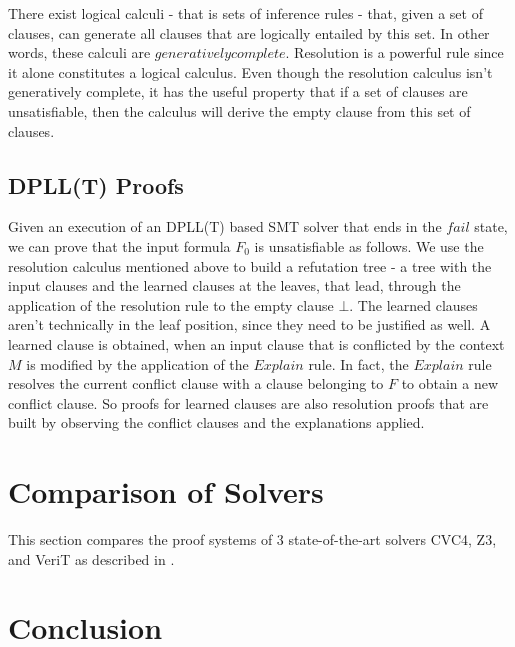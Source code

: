 \documentclass{report}
\begin{document}
There exist logical calculi - that is sets of inference 
rules - that, given a set of clauses, can generate all 
clauses that are logically entailed by this set. In other 
words, these calculi are $generatively complete$. Resolution 
is a powerful rule since it alone constitutes a logical 
calculus. Even though the resolution calculus 
isn't generatively complete, it has the useful property that 
if a set of clauses are unsatisfiable, then the calculus will 
derive the empty clause from this set of clauses. 


\subsection{DPLL(T) Proofs}
\label{sec:dplltproofs}
Given an execution of an DPLL(T) based SMT solver that ends 
in the $fail$ state, we can prove that the input formula 
$F_0$ is unsatisfiable as follows. We use the resolution 
calculus mentioned above to build a refutation tree - 
a tree with the input clauses and the learned clauses at the 
leaves, that lead, through the application of the resolution
rule to the empty clause $\bot$. The learned clauses aren't 
technically in the leaf position, since they need to be 
justified as well. A learned clause is obtained, when an input 
clause that is conflicted by the context $M$ is modified by 
the application of the $Explain$ rule. In fact, the $Explain$ 
rule resolves the current conflict clause with a clause 
belonging to $F$ to obtain a new conflict clause. So proofs 
for learned clauses are also resolution proofs that are 
built by observing the conflict clauses and the explanations 
applied.  
\section{Comparison of Solvers}
\label{sec:comp}
This section compares the proof systems of 3 state-of-the-art 
solvers CVC4, Z3, and VeriT as described in .

\section{Conclusion}
\label{sec:conc}



\end{document}

